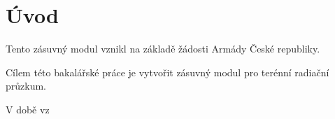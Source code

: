 \chapter{Úvod}
\label{1-uvod}

Tento zásuvný modul vznikl na základě žádosti Armády České republiky.

Cílem této bakalářské práce je vytvořit zásuvný modul pro terénní radiační průzkum.

V době vz
